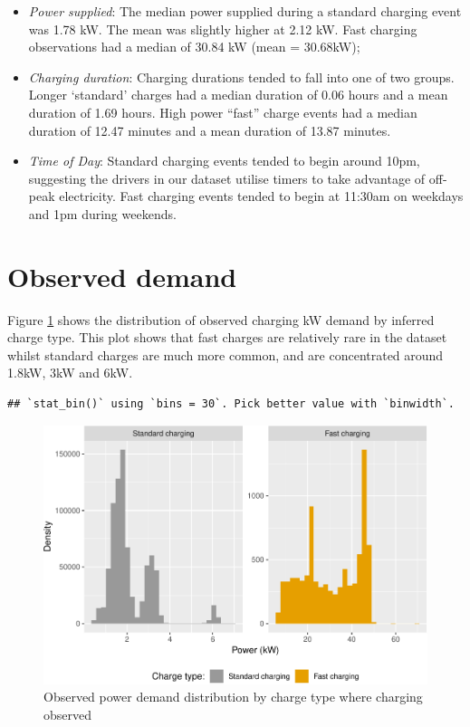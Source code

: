 \documentclass[]{article}
\providecommand{\tightlist}{%
  \setlength{\itemsep}{0pt}\setlength{\parskip}{0pt}}
\begin{document}
\begin{itemize}
\tightlist
\item
  \emph{Power supplied}: The median power supplied during a standard
  charging event was 1.78 kW. The mean was slightly higher at 2.12 kW.
  Fast charging observations had a median of 30.84 kW (mean = 30.68kW);
\item
  \emph{Charging duration}: Charging durations tended to fall into one
  of two groups. Longer `standard' charges had a median duration of 0.06
  hours and a mean duration of 1.69 hours. High power ``fast'' charge
  events had a median duration of 12.47 minutes and a mean duration of
  13.87 minutes.
\item
  \emph{Time of Day}: Standard charging events tended to begin around
  10pm, suggesting the drivers in our dataset utilise timers to take
  advantage of off-peak electricity. Fast charging events tended to
  begin at 11:30am on weekdays and 1pm during weekends.
\end{itemize}

\section{Observed demand}\label{observed-demand}

Figure \ref{fig:obsPower} shows the distribution of observed charging kW
demand by inferred charge type. This plot shows that fast charges are
relatively rare in the dataset whilst standard charges are much more
common, and are concentrated around 1.8kW, 3kW and 6kW.

\begin{verbatim}
## `stat_bin()` using `bins = 30`. Pick better value with `binwidth`.
\end{verbatim}

\begin{figure}
\centering
\includegraphics{EVBB_report_files/figure-latex/obsPower-1.pdf}
\caption{\label{fig:obsPower}Observed power demand distribution by charge
type where charging observed}
\end{figure}
\end{document}
